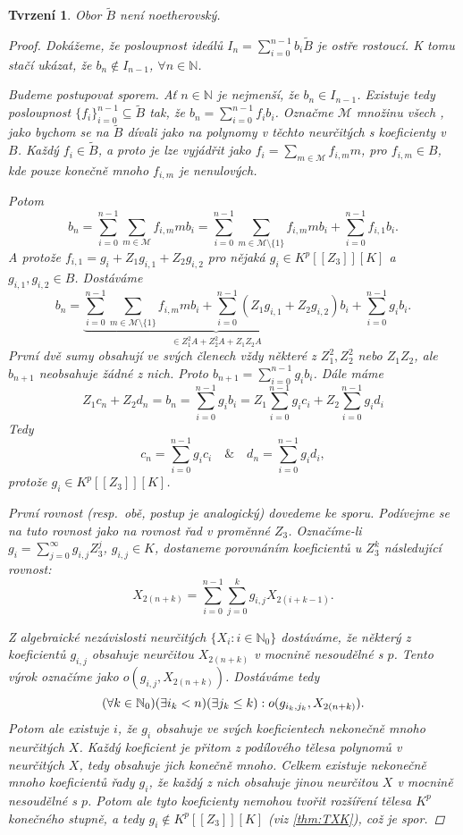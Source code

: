 \documentclass[11pt,a4paper]{article}
\newcommand\m[1]{\mathbb { #1 }} %
\newcommand\p[1]{\mathcal{ #1 }} %
\newcommand\N{\m N}
\newcommand*{\ml}[1]{\[\textstyle\let\displaystyle\textstyle#1\]}	%
\newcommand*{\mld}[1]{\[#1\]} %
\newcounter{numb}
\theoremstyle{definition}
\theoremstyle{plain}
\newtheorem{tvrzeni}[numb]{Tvrzení}
\begin{document}
\begin{tvrzeni}
	Obor $\tilde{B}$ není noetherovský.
	
	\begin{proof}
		\newcommand*{\I}{_{i = 0}^{n - 1}}

		Dokážeme, že posloupnost ideálů $I_n = \sum\I b_i \tilde{B}$ je ostře rostoucí. K tomu stačí ukázat, že $b_n \notin I_{n - 1}$, $\forall n \in \N$.

		Budeme postupovat sporem. Ať $n \in \N$ je nejmenší, že $b_n \in I_{n - 1}$. Existuje tedy posloupnost $\{f_i\}\I \subseteq \tilde{B}$ tak, že $b_n = \sum\I f_i b_i$. Označme $\p M$ množinu všech \uv{monických monočlenů v neurčitých $\{b_i: i \in \N_0\}$}, jako bychom se na $\tilde{B}$ dívali jako na polynomy v těchto neurčitých s koeficienty v $B$. Každý $f_i \in \tilde{B}$, a proto je lze vyjádřit jako $f_i = \sum_{m \in \p M} f_{i, m} m$, pro $f_{i, m} \in B$, kde pouze konečně mnoho $f_{i, m}$ je nenulových.

		Potom
		\mld{
			b_n = \sum\I \sum_{m \in \p M} f_{i, m} m b_i = \sum\I \sum_{m \in \p M \setminus \{1\}} f_{i, m} m b_i + \sum\I f_{i, 1} b_i.
		}
		A protože $f_{i, 1} = g_i + Z_1 g_{i, 1} + Z_2 g_{i, 2}$ pro nějaká $g_i \in K^p[[Z_3]][K]$ a $g_{i, 1}, g_{i, 2} \in B$. Dostáváme
		\mld{
			b_n = \underbrace{\sum\I \sum_{m \in \p M \setminus \{1\}} f_{i, m} m b_i + \sum\I \left(Z_1 g_{i, 1} + Z_2 g_{i, 2}\right)b_i}_{\in Z_1^2 A + Z_2^2 A + Z_1 Z_2 A} + \sum\I g_i b_i.
		}
		První dvě sumy obsahují ve svých členech vždy některé z $Z_1^2, Z_2^2$ nebo
		$Z_1 Z_2$, ale $b_{n + 1}$ neobsahuje žádné z nich. Proto $b_{n + 1} = \sum\I g_i b_i$. Dále máme
		\mld{
			Z_1 c_n + Z_2 d_n = b_n = \sum\I g_i b_i = Z_1 \sum\I g_i c_i + Z_2 \sum\I g_i d_i
		}
		Tedy
		\mld{
			c_n = \sum\I g_i c_i \quad \& \quad d_n = \sum\I g_i d_i,
		}
		protože $g_i \in K^p[[Z_3]][K]$.

		První rovnost (resp.\ obě, postup je analogický) dovedeme ke sporu. Podívejme se na tuto rovnost jako na rovnost řad v proměnné $Z_3$. Označíme-li $g_i = \sum_{j = 0}^\infty g_{i, j} Z_3^j$, $g_{i, j} \in K$, dostaneme porovnáním koeficientů u $Z_3^k$ následující rovnost:
		\mld{
			X_{2(n + k)} = \sum\I \sum_{j = 0}^k g_{i, j} X_{2(i + k - 1)}.
		}

		Z algebraické nezávislosti neurčitých $\{X_i: i \in \N_0\}$ dostáváme, že některý z koeficientů $g_{i, j}$ obsahuje neurčitou $X_{2(n + k)}$ v mocnině nesoudělné s $p$. Tento výrok označíme jako $o(g_{i, j}, X_{2(n + k)})$. Dostáváme tedy
		\ml{
			(\forall k \in \N_0) (\exists i_k < n) (\exists j_k \leq k): o(g_{i_k, j_k}, X_{2(n + k)}).
		}
		Potom ale existuje $i$, že $g_i$ obsahuje ve svých koeficientech nekonečně mnoho neurčitých $X$. Každý koeficient je přitom z podílového tělesa polynomů v neurčitých $X$, tedy obsahuje jich konečně mnoho. Celkem existuje nekonečně mnoho koeficientů řady $g_i$, že každý z nich obsahuje jinou neurčitou $X$ v mocnině nesoudělné s $p$. Potom ale tyto koeficienty nemohou tvořit rozšíření tělesa $K^p$ konečného stupně, a tedy $g_i \notin K^p[[Z_3]][K]$ (viz \ref{thm:TXK}), což je spor.
	\end{proof}
\end{tvrzeni}
\end{document}
